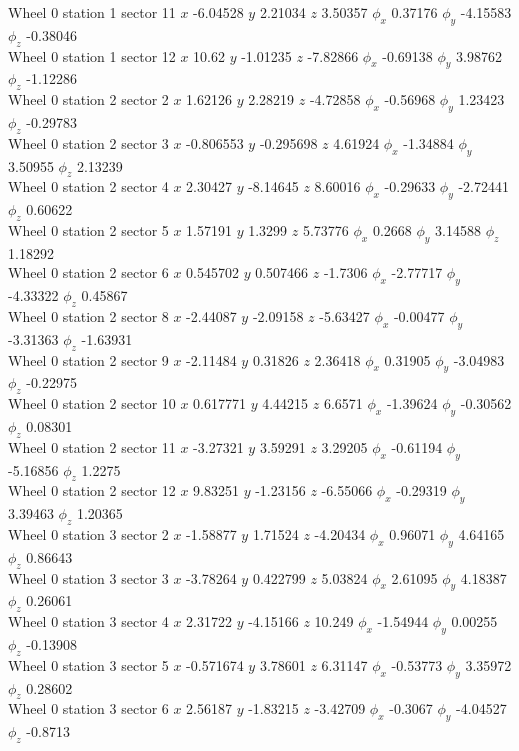 \documentclass[compress]{beamer}
\begin{document}
\begin{frame}
Wheel 0 station 1 sector 11 $x$ -6.04528 $y$ 2.21034 $z$ 3.50357 $\phi_x$ 0.37176 $\phi_y$ -4.15583 $\phi_z$ -0.38046 \\
Wheel 0 station 1 sector 12 $x$ 10.62 $y$ -1.01235 $z$ -7.82866 $\phi_x$ -0.69138 $\phi_y$ 3.98762 $\phi_z$ -1.12286 \\
Wheel 0 station 2 sector 2 $x$ 1.62126 $y$ 2.28219 $z$ -4.72858 $\phi_x$ -0.56968 $\phi_y$ 1.23423 $\phi_z$ -0.29783 \\
Wheel 0 station 2 sector 3 $x$ -0.806553 $y$ -0.295698 $z$ 4.61924 $\phi_x$ -1.34884 $\phi_y$ 3.50955 $\phi_z$ 2.13239 \\
Wheel 0 station 2 sector 4 $x$ 2.30427 $y$ -8.14645 $z$ 8.60016 $\phi_x$ -0.29633 $\phi_y$ -2.72441 $\phi_z$ 0.60622 \\
Wheel 0 station 2 sector 5 $x$ 1.57191 $y$ 1.3299 $z$ 5.73776 $\phi_x$ 0.2668 $\phi_y$ 3.14588 $\phi_z$ 1.18292 \\
Wheel 0 station 2 sector 6 $x$ 0.545702 $y$ 0.507466 $z$ -1.7306 $\phi_x$ -2.77717 $\phi_y$ -4.33322 $\phi_z$ 0.45867 \\
Wheel 0 station 2 sector 8 $x$ -2.44087 $y$ -2.09158 $z$ -5.63427 $\phi_x$ -0.00477 $\phi_y$ -3.31363 $\phi_z$ -1.63931 \\
Wheel 0 station 2 sector 9 $x$ -2.11484 $y$ 0.31826 $z$ 2.36418 $\phi_x$ 0.31905 $\phi_y$ -3.04983 $\phi_z$ -0.22975 \\
Wheel 0 station 2 sector 10 $x$ 0.617771 $y$ 4.44215 $z$ 6.6571 $\phi_x$ -1.39624 $\phi_y$ -0.30562 $\phi_z$ 0.08301 \\
Wheel 0 station 2 sector 11 $x$ -3.27321 $y$ 3.59291 $z$ 3.29205 $\phi_x$ -0.61194 $\phi_y$ -5.16856 $\phi_z$ 1.2275 \\
Wheel 0 station 2 sector 12 $x$ 9.83251 $y$ -1.23156 $z$ -6.55066 $\phi_x$ -0.29319 $\phi_y$ 3.39463 $\phi_z$ 1.20365 \\
Wheel 0 station 3 sector 2 $x$ -1.58877 $y$ 1.71524 $z$ -4.20434 $\phi_x$ 0.96071 $\phi_y$ 4.64165 $\phi_z$ 0.86643 \\
Wheel 0 station 3 sector 3 $x$ -3.78264 $y$ 0.422799 $z$ 5.03824 $\phi_x$ 2.61095 $\phi_y$ 4.18387 $\phi_z$ 0.26061 \\
Wheel 0 station 3 sector 4 $x$ 2.31722 $y$ -4.15166 $z$ 10.249 $\phi_x$ -1.54944 $\phi_y$ 0.00255 $\phi_z$ -0.13908 \\
Wheel 0 station 3 sector 5 $x$ -0.571674 $y$ 3.78601 $z$ 6.31147 $\phi_x$ -0.53773 $\phi_y$ 3.35972 $\phi_z$ 0.28602 \\
Wheel 0 station 3 sector 6 $x$ 2.56187 $y$ -1.83215 $z$ -3.42709 $\phi_x$ -0.3067 $\phi_y$ -4.04527 $\phi_z$ -0.8713 \\

\end{frame}
\end{document}
